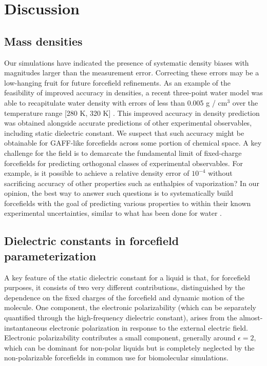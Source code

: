 \documentclass[aip, jcp, reprint]{revtex4-1}  %
\begin{document}

\section{Discussion}

\subsection{Mass densities}

Our simulations have indicated the presence of systematic density biases with magnitudes larger than the measurement error.  
Correcting these errors may be a low-hanging fruit for future forcefield refinements.
As an example of the feasibility of improved accuracy in densities, a recent three-point water model was able to recapitulate water density with errors of less than 0.005 g / cm$^{3}$ over the temperature range [280 K, 320 K] \cite{wang2014building}.
This improved accuracy in density prediction was obtained alongside accurate predictions of other experimental observables, including static dielectric constant.  
We suspect that such accuracy might be obtainable for GAFF-like forcefields across some portion of chemical space.  
A key challenge for the field is to demarcate the fundamental limit of fixed-charge forcefields for predicting orthogonal classes of experimental observables.
For example, is it possible to achieve a relative density error of $10^{-4}$ without sacrificing accuracy of other properties such as enthalpies of vaporization?
In our opinion, the best way to answer such questions is to systematically build forcefields with the goal of predicting various properties to within their known experimental uncertainties, similar to what has been done for water \cite{horn2004, wang2014building}.



\subsection{Dielectric constants in forcefield parameterization}


A key feature of the static dielectric constant for a liquid is that, for forcefield purposes, it consists of two very different contributions, distinguished by the dependence on the fixed charges of the forcefield and dynamic motion of the molecule. 
One component, the electronic polarizability (which can be separately quantified through the high-frequency dielectric constant), arises from the almost-instantaneous electronic polarization in response to the external electric field.
Electronic polarizability contributes a small component, generally around $\epsilon = 2$, which can be dominant for non-polar liquids but is completely neglected by the non-polarizable forcefields in common use for biomolecular simulations. 
\end{document}
